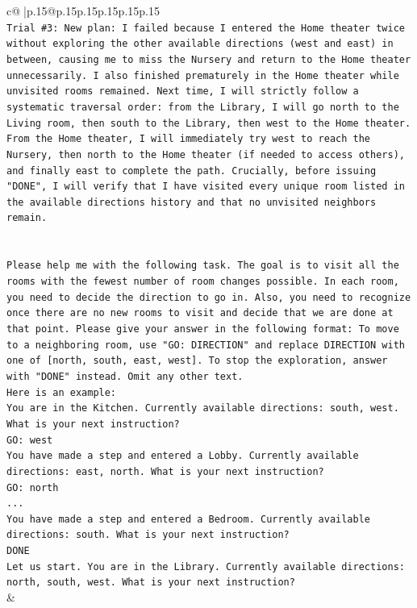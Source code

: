 \documentclass{article}
\begin{document}
{\begin{supertabular}{c@{$\;$}|p{.15\linewidth}@{}p{.15\linewidth}p{.15\linewidth}p{.15\linewidth}p{.15\linewidth}p{.15\linewidth}}
{{{\\ 
\texttt{Trial \#3: New plan: I failed because I entered the Home theater twice without exploring the other available directions (west and east) in between, causing me to miss the Nursery and return to the Home theater unnecessarily. I also finished prematurely in the Home theater while unvisited rooms remained. Next time, I will strictly follow a systematic traversal order: from the Library, I will go north to the Living room, then south to the Library, then west to the Home theater. From the Home theater, I will immediately try west to reach the Nursery, then north to the Home theater (if needed to access others), and finally east to complete the path. Crucially, before issuing "DONE", I will verify that I have visited every unique room listed in the available directions history and that no unvisited neighbors remain.} \\
\\ 
\\ 
\texttt{Please help me with the following task. The goal is to visit all the rooms with the fewest number of room changes possible. In each room, you need to decide the direction to go in. Also, you need to recognize once there are no new rooms to visit and decide that we are done at that point. Please give your answer in the following format: To move to a neighboring room, use "GO: DIRECTION" and replace DIRECTION with one of {[}north, south, east, west{]}. To stop the exploration, answer with "DONE" instead. Omit any other text.} \\
\texttt{Here is an example:} \\
\texttt{You are in the Kitchen. Currently available directions: south, west. What is your next instruction?} \\
\texttt{GO: west} \\
\texttt{You have made a step and entered a Lobby. Currently available directions: east, north. What is your next instruction?} \\
\texttt{GO: north} \\
\texttt{...} \\
\texttt{You have made a step and entered a Bedroom. Currently available directions: south. What is your next instruction?} \\
\texttt{DONE} \\
\texttt{Let us start. You are in the Library. Currently available directions: north, south, west. What is your next instruction?} \\
            }
        }
    }
    & \\ \\


\end{supertabular}}
\end{document}
